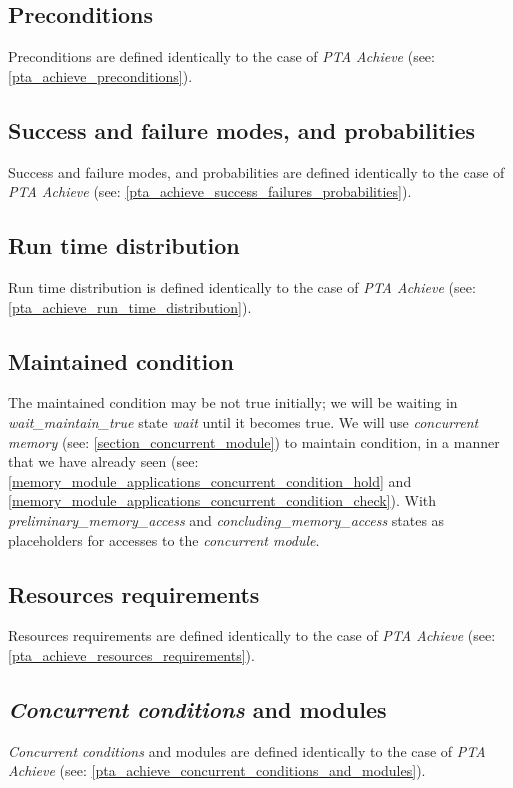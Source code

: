 \subsection{Preconditions}
Preconditions are defined identically to the case of \textit{PTA Achieve} (see: \ref{pta_achieve_preconditions}).\\
\subsection{Success and failure modes, and probabilities }
Success and failure modes, and probabilities are defined identically to the case of \textit{PTA Achieve} (see: \ref{pta_achieve_success_failures_probabilities}).\\
\subsection{Run time distribution}
Run time distribution is defined identically to the case of \textit{PTA Achieve} (see: \ref{pta_achieve_run_time_distribution}).\\
\subsection{Maintained condition }
The maintained condition may be not true initially; we will be waiting in \textcolor{ColorUppaalState}{\textit{wait_maintain_true}} state \textit{wait} until it becomes true. We will use \textit{concurrent memory} (see: \ref{section_concurrent_module}) to maintain condition, in a manner that we have already seen (see: \ref{memory_module_applications_concurrent_condition_hold} and \ref{memory_module_applications_concurrent_condition_check}). With \textcolor{ColorUppaalState}{\textit{preliminary_memory_access}} and \textcolor{ColorUppaalState}{\textit{concluding_memory_access}} states as placeholders for accesses to the \textit{concurrent module}.\\
\subsection{Resources requirements}
Resources requirements are defined identically to the case of \textit{PTA Achieve}  (see: \ref{pta_achieve_resources_requirements}).\\
\subsection{\textit{Concurrent conditions} and modules}
\textit{Concurrent conditions} and modules are defined identically to the case of \textit{PTA Achieve}  (see: \ref{pta_achieve_concurrent_conditions_and_modules}).\\
